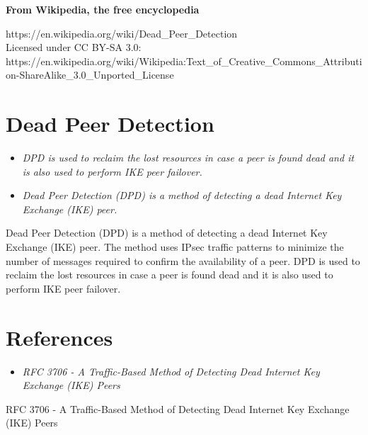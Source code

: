 \textbf{From Wikipedia, the free encyclopedia}

https://en.wikipedia.org/wiki/Dead\_Peer\_Detection\\
Licensed under CC BY-SA 3.0:\\
https://en.wikipedia.org/wiki/Wikipedia:Text\_of\_Creative\_Commons\_Attribution-ShareAlike\_3.0\_Unported\_License

\section{Dead Peer Detection}\label{dead-peer-detection}

\begin{itemize}
\item
  \emph{DPD is used to reclaim the lost resources in case a peer is
  found dead and it is also used to perform IKE peer failover.}
\item
  \emph{Dead Peer Detection (DPD) is a method of detecting a dead
  Internet Key Exchange (IKE) peer.}
\end{itemize}

Dead Peer Detection (DPD) is a method of detecting a dead Internet Key
Exchange (IKE) peer. The method uses IPsec traffic patterns to minimize
the number of messages required to confirm the availability of a peer.
DPD is used to reclaim the lost resources in case a peer is found dead
and it is also used to perform IKE peer failover.

\section{References}\label{references}

\begin{itemize}
\item
  \emph{RFC 3706 - A Traffic-Based Method of Detecting Dead Internet Key
  Exchange (IKE) Peers}
\end{itemize}

RFC 3706 - A Traffic-Based Method of Detecting Dead Internet Key
Exchange (IKE) Peers
